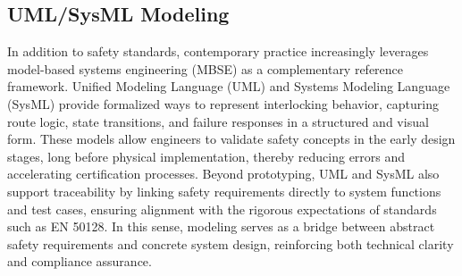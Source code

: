 \subsection{UML/SysML Modeling}
In addition to safety standards, contemporary practice increasingly leverages model-based systems engineering (MBSE) as a complementary reference framework. Unified Modeling Language (UML) and Systems Modeling Language (SysML) provide formalized ways to represent interlocking behavior, capturing route logic, state transitions, and failure responses in a structured and visual form. These models allow engineers to validate safety concepts in the early design stages, long before physical implementation, thereby reducing errors and accelerating certification processes. Beyond prototyping, UML and SysML also support traceability by linking safety requirements directly to system functions and test cases, ensuring alignment with the rigorous expectations of standards such as EN 50128. In this sense, modeling serves as a bridge between abstract safety requirements and concrete system design, reinforcing both technical clarity and compliance assurance.
